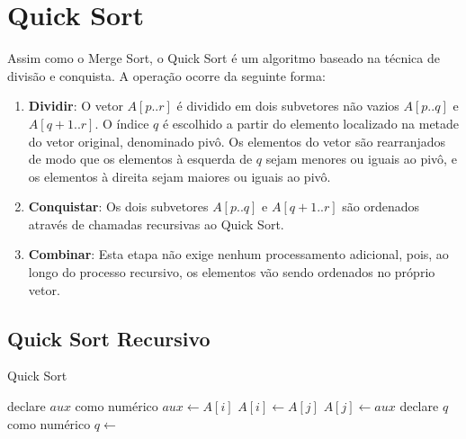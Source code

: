 \section{Quick Sort}
\label{sec:quick-sort-teo}

Assim como o Merge Sort, o Quick Sort é um algoritmo baseado na técnica de divisão e conquista. A operação ocorre da seguinte forma:

\begin{enumerate}
	\item \textbf{Dividir}: O vetor \( A[p..r] \) é dividido em dois subvetores não vazios \( A[p..q] \) e \( A[q+1..r] \). O índice \( q \) é escolhido a partir do elemento localizado na metade do vetor original, denominado pivô. Os elementos do vetor são rearranjados de modo que os elementos à esquerda de \( q \) sejam menores ou iguais ao pivô, e os elementos à direita sejam maiores ou iguais ao pivô.

	\item \textbf{Conquistar}: Os dois subvetores \( A[p..q] \) e \( A[q+1..r] \) são ordenados através de chamadas recursivas ao Quick Sort.

	\item \textbf{Combinar}: Esta etapa não exige nenhum processamento adicional, pois, ao longo do processo recursivo, os elementos vão sendo ordenados no próprio vetor.
\end{enumerate}

\subsection{Quick Sort Recursivo}

\begin{algorithm}
	\caption{Quick Sort}
	\label{algo:bubble_sort}
	\begin{algorithmic}[1]
		\Statex
		\State declare $aux$ como numérico
		\State $aux \gets A[i]$
		\State $A[i] \gets A[j]$
		\State $A[j] \gets aux$
		\EndFunction
		\Statex
		\State declare $q$ como numérico
		\State $q \gets$ 
		\State {}
		\State {}
		\EndIf
		\EndFunction

	\end{algorithmic}
\end{algorithm}
\FloatBarrier

\newpage
